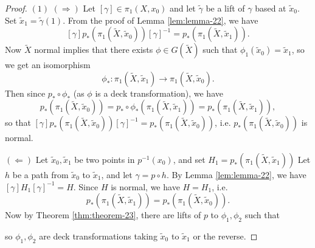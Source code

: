 \begin{proof}
  $(1)$ $(\Rightarrow)$ Let
  $[\gamma] \in \pi_1(X, x_0)$ and let
  $\widetilde{\gamma}$ be a lift of $\gamma$
  based at $\widetilde{x}_0$. Set
  $\widetilde{x}_1 = \widetilde{\gamma}(1)$.
  From the proof of Lemma \ref{lem:lemma-22},
  we have
  \[
    [\gamma] p_*(\pi_1(\widetilde{X}, \widetilde{x}_0)) [\gamma]^{-1} = p_*(\pi_1(\widetilde{X}, \widetilde{x}_1)).
  \]
  Now $\widetilde{X}$ normal implies that there exists
  $\phi \in G(\widetilde{X})$ such that
  $\phi_1(\widetilde{x}_0) = \widetilde{x}_1$, so we
  get an isomorphism
  \[
    \phi_* : \pi_1(\widetilde{X}, \widetilde{x}_1) \to \pi_1(\widetilde{X}, \widetilde{x}_0).
  \]
  Then since $p_* \circ \phi_*$ (as $\phi$ is a
  deck transformation), we have
  \[
    p_*(\pi_1(\widetilde{X}, \widetilde{x}_0))
    = p_* \circ \phi_* (\pi_1(\widetilde{X}, \widetilde{x}_1))
    = p_*(\pi_1(\widetilde{X}, \widetilde{x}_1)),
  \]
  so that
  $[\gamma] p_*(\pi_1(\widetilde{X}, \widetilde{x}_0)) [\gamma]^{-1} = p_*(\pi_1(\widetilde{X}, \widetilde{x}_0))$, i.e.
  $p_*(\pi_1(\widetilde{X}, \widetilde{x}_0))$ is normal.

  $(\Leftarrow)$ Let $\widetilde{x}_0, \widetilde{x}_1$
  be two points in $p^{-1}(x_0)$, and
  set $H_1 = p_*(\pi_1(\widetilde{X}, \widetilde{x}_1))$
  Let $h$ be a path from $\widetilde{x}_0$ to
  $\widetilde{x}_1$, and let $\gamma = p \circ h$.
  By Lemma \ref{lem:lemma-22}, we have
  $[\gamma] H_1 [\gamma]^{-1} = H$. Since $H$ is normal,
  we have $H = H_1$, i.e.
  \[
    p_*(\pi_1(\widetilde{X}, \widetilde{x}_1)) = p_*(\pi_1(\widetilde{X}, \widetilde{x}_0)).
  \]
  Now by Theorem \ref{thm:theorem-23}, there are
  lifts of $p$ to $\phi_1, \phi_2$ such that
  \begin{center}
  \end{center}
  so $\phi_1, \phi_2$ are deck transformations
  taking $\widetilde{x}_0$ to $\widetilde{x}_1$
  or the reverse.


\end{proof}
